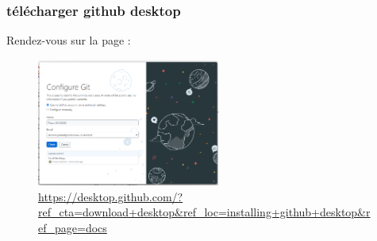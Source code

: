 \begin{frame}
  \frametitle{télécharger github desktop}

Rendez-vous sur la page : 
\begin{figure}
\caption{\url{https://desktop.github.com/?ref_cta=download+desktop&ref_loc=installing+github+desktop&ref_page=docs}}
  \includegraphics[width=6cm]{images/github_desktop_connect.png}
  
  \end{figure}
  
\end{frame}


